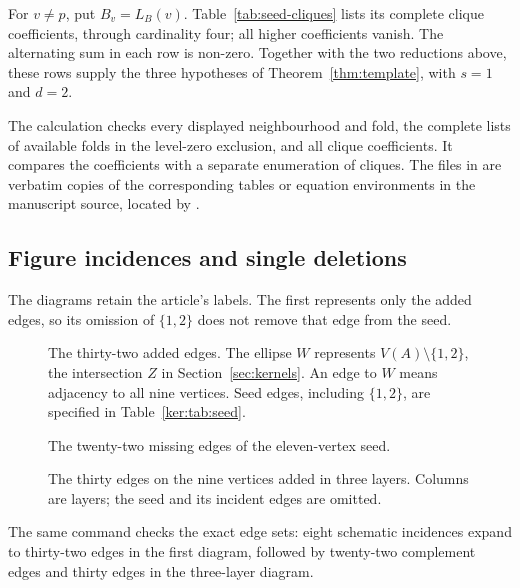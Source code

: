 For $v\ne p$, put $B_v=L_B(v)$. Table~\ref{tab:seed-cliques} lists its
complete clique coefficients, through cardinality four; all higher
coefficients vanish. The alternating sum in each row is non-zero.
Together with the two reductions above, these rows supply the three
hypotheses of Theorem~\ref{thm:template}, with $s=1$ and $d=2$.
\begin{table}[htbp]
\centering
\caption{Clique counts in the thirteen non-central neighbourhoods of $B$.}\label{tab:seed-cliques}

\end{table}
The calculation checks every displayed neighbourhood and fold, the complete
lists of available folds in the level-zero exclusion, and all clique
coefficients. It compares the coefficients with a separate enumeration of
cliques. The files in  are verbatim copies of
the corresponding tables or equation environments in the manuscript source,
located by .

\subsection{Figure incidences and single deletions}
The diagrams retain the article's labels. The first represents only the added
edges, so its omission of $\{1,2\}$ does not remove that edge from the seed.
\begin{figure}[htbp]
\centering
\caption{The thirty-two added edges. The ellipse $W$ represents
$V(A)\setminus\{1,2\}$, the intersection $Z$ in Section~\ref{sec:kernels}.
An edge to $W$ means adjacency to all nine vertices. Seed edges, including
$\{1,2\}$, are specified in Table~\ref{ker:tab:seed}.}\label{fig:extension}
\end{figure}
\begin{figure}[htbp]
\centering
\caption{The twenty-two missing edges of the eleven-vertex seed.}\label{fig:complement}
\end{figure}
\begin{figure}[htbp]
\centering
\caption{The thirty edges on the nine vertices added in three layers.
Columns are layers; the seed and its incident edges are omitted.}\label{fig:layers}
\end{figure}
The same command checks the exact edge sets: eight schematic incidences
expand to thirty-two edges in the first diagram, followed by twenty-two
complement edges and thirty edges in the three-layer diagram.

